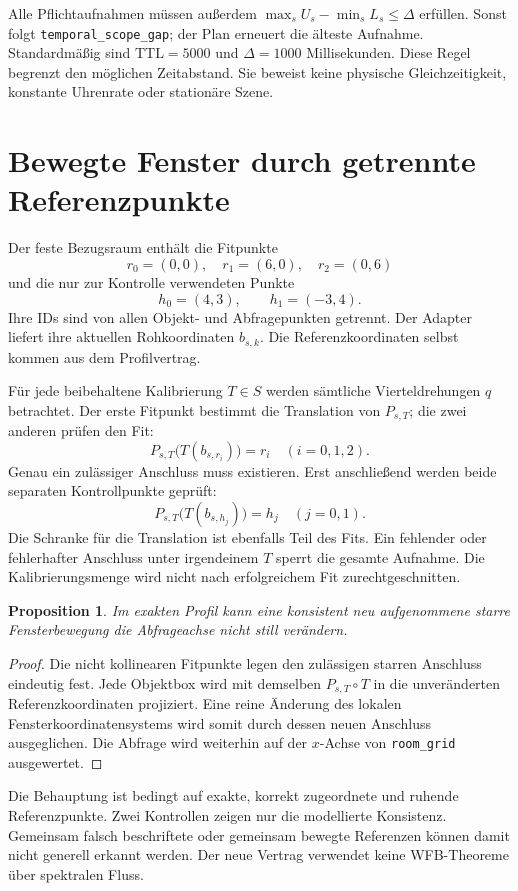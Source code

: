 \documentclass[11pt,a4paper]{article}
\newcommand{\nextsection}[2]{\clearpage{\color{accent}\small\textsf{#1}}\section{#2}}
\newtheorem{proposition}{Proposition}[section]
\begin{document}
Alle Pflichtaufnahmen müssen außerdem
$\max_s U_s-\min_s L_s\leq\Delta$ erfüllen. Sonst folgt
\texttt{temporal\_scope\_gap}; der Plan erneuert die älteste Aufnahme.
Standardmäßig sind $\mathrm{TTL}=5000$ und $\Delta=1000$ Millisekunden.
Diese Regel begrenzt den möglichen Zeitabstand. Sie beweist keine
physische Gleichzeitigkeit, konstante Uhrenrate oder stationäre Szene.

\nextsection{78 / RAUMREGISTRIERUNG}{Bewegte Fenster durch getrennte Referenzpunkte}
Der feste Bezugsraum enthält die Fitpunkte
\[
r_0=(0,0),\quad r_1=(6,0),\quad r_2=(0,6)
\]
und die nur zur Kontrolle verwendeten Punkte
\[
h_0=(4,3),\qquad h_1=(-3,4).
\]
Ihre IDs sind von allen Objekt- und Abfragepunkten getrennt.
Der Adapter liefert ihre aktuellen Rohkoordinaten $b_{s,k}$.
Die Referenzkoordinaten selbst kommen aus dem Profilvertrag.

Für jede beibehaltene Kalibrierung $T\in S$ werden sämtliche
Vierteldrehungen $q$ betrachtet. Der erste Fitpunkt bestimmt die
Translation von $P_{s,T}$; die zwei anderen prüfen den Fit:
\[
P_{s,T}\bigl(T(b_{s,r_i})\bigr)=r_i\quad (i=0,1,2).
\]
Genau ein zulässiger Anschluss muss existieren. Erst anschließend
werden beide separaten Kontrollpunkte geprüft:
\[
P_{s,T}\bigl(T(b_{s,h_j})\bigr)=h_j\quad (j=0,1).
\]
Die Schranke für die Translation ist ebenfalls Teil des Fits.
Ein fehlender oder fehlerhafter Anschluss unter irgendeinem $T$
sperrt die gesamte Aufnahme. Die Kalibrierungsmenge wird nicht
nach erfolgreichem Fit zurechtgeschnitten.

\begin{proposition}
Im exakten Profil kann eine konsistent neu aufgenommene starre
Fensterbewegung die Abfrageachse nicht still verändern.
\end{proposition}
\begin{proof}
Die nicht kollinearen Fitpunkte legen den zulässigen starren
Anschluss eindeutig fest. Jede Objektbox wird mit demselben
$P_{s,T}\circ T$ in die unveränderten Referenzkoordinaten projiziert.
Eine reine Änderung des lokalen Fensterkoordinatensystems wird
somit durch dessen neuen Anschluss ausgeglichen. Die Abfrage
wird weiterhin auf der $x$-Achse von \texttt{room\_grid} ausgewertet.
\end{proof}

Die Behauptung ist bedingt auf exakte, korrekt zugeordnete und
ruhende Referenzpunkte. Zwei Kontrollen zeigen nur die modellierte
Konsistenz. Gemeinsam falsch beschriftete oder gemeinsam bewegte
Referenzen können damit nicht generell erkannt werden. Der neue
Vertrag verwendet keine WFB-Theoreme über spektralen Fluss.
\end{document}
